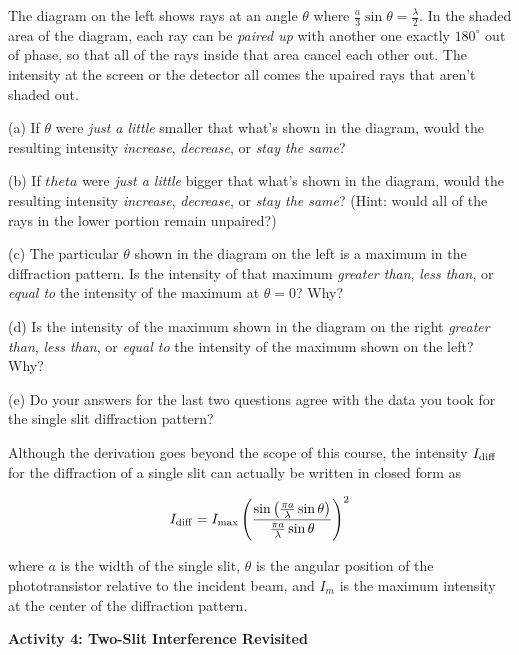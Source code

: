 The diagram on the left shows rays at an angle $\theta$ where $\frac{a}{3} \sin \theta = \frac{\lambda}{2}$.  In the shaded area of the diagram, each ray can be \textit{paired up} with another one exactly $180^{\circ}$ out of phase, so that all of the rays inside that area cancel each other out.  The intensity at the screen or the detector all comes the upaired rays that aren't shaded out.

(a) If $\theta$ were \textit{just a little} smaller that what's shown in the diagram, would the resulting intensity \textit{increase}, \textit{decrease}, or \textit{stay the same}? 
\answerspace{0.4in}

(b) If $theta$ were \textit{just a little} bigger that what's shown in the diagram, would the resulting intensity \textit{increase}, \textit{decrease}, or \textit{stay the same}?  (Hint: would all of the rays in the lower portion remain unpaired?)
\answerspace{0.4in}

(c) The particular $\theta$ shown in the diagram on the left is a maximum in the diffraction pattern.  Is the intensity of that maximum \textit{greater than}, \textit{less than}, or \textit{equal to} the intensity of the maximum at $\theta = 0$?  Why?
\answerspace{0.4in}

(d) Is the intensity of the maximum shown in the diagram on the right \textit{greater than}, \textit{less than}, or \textit{equal to} the intensity of the maximum shown on the left?  Why?  
\answerspace{0.4in}

(e) Do your answers for the last two questions agree with the data you took for the single slit diffraction pattern?
\answerspace{0.2in}


\pagebreak[2]
Although the derivation goes beyond the scope of this course, the intensity $I_{\rm{diff}}$ for the diffraction of a single slit can actually be written in closed form as

\begin{displaymath} 
I_{\rm{diff}} = I_{\rm{max}} \left( \frac {\sin \left(\frac {\pi a} {\lambda} \sin \theta \right)} {\frac {\pi a} {\lambda} \sin \theta} \right)^2 \end{displaymath}

where $a$ is the width of the single slit, \( \theta  \) is the angular
position of the phototransistor relative to the incident beam, and $I_{m}$
is the maximum intensity at the center of the diffraction pattern.

\pagebreak[2]
\textbf{Activity 4: Two-Slit Interference Revisited}


